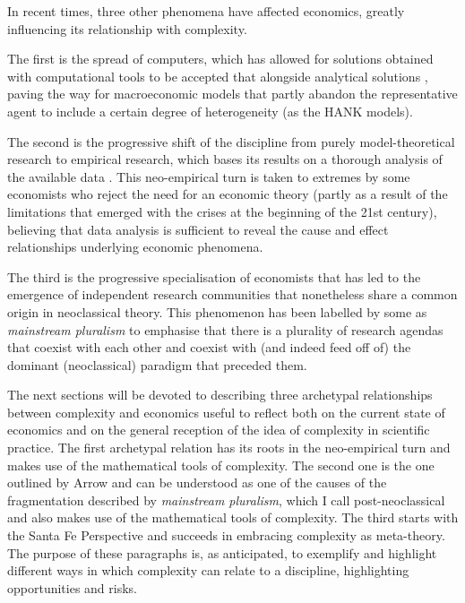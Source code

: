 \documentclass[a4paper, headings=standardclasses]{scrartcl}
\begin{document}
In recent times, three other phenomena have affected economics, greatly influencing its relationship with complexity.

The first is the spread of computers, which has allowed for solutions obtained with computational tools to be accepted that alongside analytical solutions \parencite{cherrier2023, backhouse2016}, paving the way for macroeconomic models that partly abandon the representative agent to include a certain degree of heterogeneity (as the HANK models).

The second is the progressive shift of the discipline from purely model-theoretical research to empirical research, which bases its results on a thorough analysis of the available data \parencite{cherrier2018, backhouse2017}.
This neo-empirical turn is taken to extremes by some economists who reject the need for an economic theory (partly as a result of the limitations that emerged with the crises at the beginning of the 21st century), believing that data analysis is sufficient to reveal the cause and effect relationships underlying economic phenomena.

The third is the progressive specialisation of economists that has led to the emergence of independent research communities that nonetheless share a common origin in neoclassical theory. This phenomenon has been labelled by some as \textit{mainstream pluralism} \parencite{cedrini2018, davis2006, davis2019a} to emphasise that there is a plurality of research agendas that coexist with each other and coexist with (and indeed feed off of) the dominant (neoclassical) paradigm that preceded them.

The next sections will be devoted to describing three archetypal relationships between complexity and economics useful to reflect both on the current state of economics and on the general reception of the idea of complexity in scientific practice.
The first archetypal relation has its roots in the neo-empirical turn and makes use of the mathematical tools of complexity. The second one is the one outlined by Arrow and can be understood as one of the causes of the fragmentation described by \textit{mainstream pluralism}, which I call post-neoclassical and also makes use of the mathematical tools of complexity.
The third starts with the Santa Fe Perspective and succeeds in embracing complexity as meta-theory.
The purpose of these paragraphs is, as anticipated, to exemplify and highlight different ways in which complexity can relate to a discipline, highlighting opportunities and risks.
\end{document}
